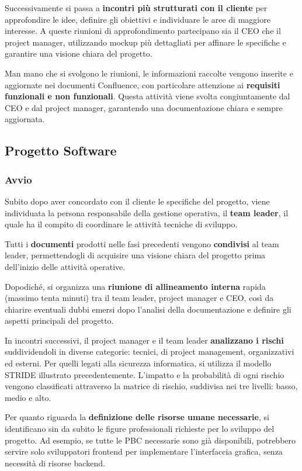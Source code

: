     Successivamente si passa a \textbf{incontri più strutturati con il cliente} per approfondire le idee, definire gli obiettivi
    e individuare le aree di maggiore interesse. A queste riunioni di approfondimento partecipano sia il CEO che il project
    manager, utilizzando mockup più dettagliati per affinare le specifiche e garantire una visione chiara del progetto.

    Man mano che si svolgono le riunioni, le informazioni raccolte vengono inserite e aggiornate nei documenti Confluence,
    con particolare attenzione ai \textbf{requisiti funzionali e non funzionali}. Questa attività viene svolta
    congiuntamente dal CEO e dal project manager, garantendo una documentazione chiara e sempre aggiornata.

    \subsection{Progetto Software}
    \subsubsection{Avvio}

    Subito dopo aver concordato con il cliente le specifiche del progetto, viene individuata la persona responsabile
    della gestione operativa, il \textbf{team leader}, il quale ha il compito di coordinare le attività tecniche di sviluppo.

    Tutti i \textbf{documenti} prodotti nelle fasi precedenti vengono \textbf{condivisi} al team leader, permettendogli di
    acquisire una visione chiara del progetto prima dell’inizio delle attività operative.

    Dopodiché, si organizza una \textbf{riunione di allineamento interna} rapida (massimo tenta minuti) tra il team leader,
    project manager e CEO, così da chiarire eventuali dubbi emersi dopo l’analisi della documentazione e definire gli aspetti principali del progetto.

    In incontri successivi, il project manager e il team leader \textbf{analizzano i rischi} suddividendoli in diverse categorie: tecnici,
    di project management, organizzativi ed esterni. Per quelli legati alla sicurezza informatica, si utilizza il modello STRIDE illustrato precedentemente.
    L’impatto e la probabilità di ogni rischio vengono classificati attraverso la matrice di rischio, suddivisa nei tre livelli: basso, medio e alto.

    Per quanto riguarda la \textbf{definizione delle risorse umane necessarie}, si identificano sin da subito le figure professionali richieste
    per lo sviluppo del progetto. Ad esempio, se tutte le \ac{PBC} necessarie sono
    già disponibili, potrebbero servire solo sviluppatori frontend per implementare l’interfaccia grafica, senza necessità di risorse backend.
    
